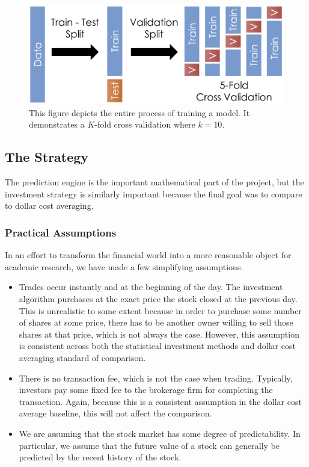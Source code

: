 \documentclass[12pt]{article}
\begin{document}
\begin{figure}[ht]
	\centering
	\includegraphics[width=.5\textwidth]{test_train_validate.png}
	\caption{This figure depicts the entire process of training a model. It demonstrates a $K$-fold cross validation where $k=10$. \cite{kfold2}}
	\label{test_train_validate}
\end{figure}

\subsection{The Strategy}
The prediction engine is the important mathematical part of the project, but the investment strategy is similarly important because the final goal was to compare to dollar cost averaging. 

\subsubsection{Practical Assumptions}
In an effort to transform the financial world into a more reasonable object for academic research, we have made a few simplifying assumptions.
\begin{itemize}
	\item Trades occur instantly and at the beginning of the day. The investment algorithm purchases at the exact price the stock closed at the previous day. This is unrealistic to some extent because in order to purchase some number of shares at some price, there has to be another owner willing to sell those shares at that price, which is not always the case. However, this assumption is consistent across both the statistical investment methods and dollar cost averaging standard of comparison.
	
	\item There is no transaction fee, which is not the case when trading. Typically, investors pay some fixed fee to the brokerage firm for completing the transaction. Again, because this is a consistent assumption in the dollar cost average baseline, this will not affect the comparison.
	
	
	\item We are assuming that the stock market has some degree of predictability. In particular, we assume that the future value of a stock can generally be predicted by the recent history of the stock.
\end{itemize}
\end{document}
